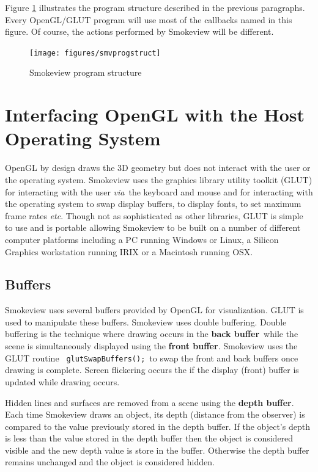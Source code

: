 \documentclass[11pt,twoside]{book}
\begin{document}
Figure \ref{figprogstruct} illustrates the program structure described in the previous paragraphs.  Every OpenGL/GLUT program will use most of the callbacks named in this figure.  Of course, the actions performed by Smokeview will be different.

\begin{figure}
\begin{center}
\texttt{[image: figures/smvprogstruct]}
\end{center}
\caption{Smokeview program structure}
\label{figprogstruct}
\end{figure}

%
%

\chapter{Interfacing OpenGL with the Host Operating System}
\label{openglinterface}
OpenGL by design draws
the 3D geometry but does not interact with the user or the
operating system. Smokeview uses the graphics library utility
toolkit (GLUT) for interacting with the user {\em via}\ the
keyboard and mouse and for interacting with the operating system
to swap display buffers, to display fonts, to set maximum frame
rates {\em etc}. Though not as sophisticated as other libraries,
GLUT is simple to use and is portable allowing Smokeview to be
built on a number of different computer platforms including a PC
running Windows or Linux, a Silicon Graphics workstation running
IRIX or a Macintosh running OSX.

\section{Buffers} Smokeview uses several buffers provided by
OpenGL for visualization.  GLUT is used to manipulate these
buffers. Smokeview uses double buffering.  Double buffering is the technique where drawing occurs in the
{\bf back buffer}\ while the scene is simultaneously displayed using
the {\bf front buffer}. Smokeview uses the GLUT routine {\tt
glutSwapBuffers();}\ to swap the front and back buffers once
drawing is complete. Screen flickering occurs the if the display (front) buffer is updated while drawing occurs.

Hidden lines and surfaces are removed from a scene using the {\bf
depth buffer}.  Each time Smokeview draws an object, its depth
(distance from the observer) is compared to the value previously
stored in the depth buffer.  If the object's depth is less than
the value stored in the depth buffer then the object is considered
visible and the new depth value is store in the buffer. Otherwise
the depth buffer remains unchanged and the object is considered
hidden.
\end{document}
